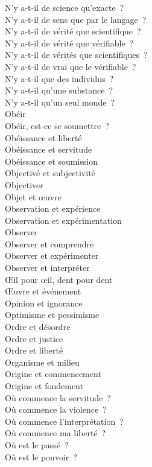 \documentclass[a4paper,12pt]{article}
\begin{document}
N'y a-t-il de science qu'exacte ? \\
N'y a-t-il de sens que par le langage ? \\
N'y a-t-il de vérité que scientifique ? \\
N'y a-t-il de vérité que vérifiable ? \\
N'y a-t-il de vérités que scientifiques ? \\
N'y a-t-il de vrai que le vérifiable ? \\
N'y a-t-il que des individus ? \\
N'y a-t-il qu'une substance ? \\
N'y a-t-il qu'un seul monde ? \\
Obéir \\
Obéir, est-ce se soumettre ? \\
Obéissance et liberté \\
Obéissance et servitude \\
Obéissance et soumission \\
Objectivé et subjectivité \\
Objectiver \\
Objet et œuvre \\
Observation et expérience \\
Observation et expérimentation \\
Observer \\
Observer et comprendre \\
Observer et expérimenter \\
Observer et interpréter \\
Œil pour œil, dent pour dent \\
Œuvre et événement \\
Opinion et ignorance \\
Optimisme et pessimisme \\
Ordre et désordre \\
Ordre et justice \\
Ordre et liberté \\
Organisme et milieu \\
Origine et commencement \\
Origine et fondement \\
Où commence la servitude ? \\
Où commence la violence ? \\
Où commence l'interprétation ? \\
Où commence ma liberté ? \\
Où est le passé ? \\
Où est le pouvoir ? \\
\end{document}
